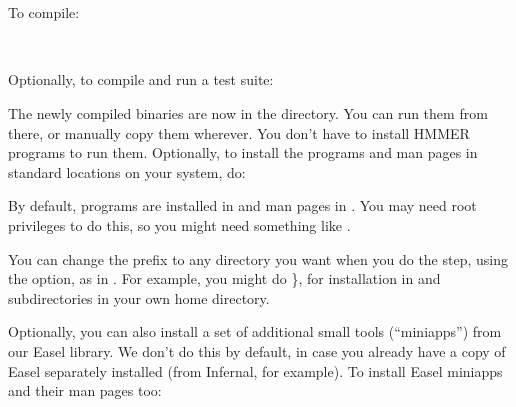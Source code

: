   \vspace{1ex}
  \\
  \\
  \vspace{1ex}

To compile:

  \vspace{1ex}
  \\ 
  \vspace{1ex}

Optionally, to compile and run a test suite:

  \vspace{1ex}
  \vspace{1ex}

The newly compiled binaries are now in the  directory.  You
can run them from there, or manually copy them wherever.  You don't
have to install HMMER programs to run them. Optionally, to install the
programs and man pages in standard locations on your system, do:

  \vspace{1ex}
  \vspace{1ex}

By default, programs are installed in  and man
pages in . You may need root
privileges to do this, so you might need something like .

You can change the  prefix to any directory you want
when you do the  step, using the  option, as in . For example, you might do
\}, for installation in
 and  subdirectories in your own home
directory.

Optionally, you can also install a set of additional small tools
(``miniapps'') from our Easel library.  We don't do this by default,
in case you already have a copy of Easel separately installed (from
Infernal, for example). To install Easel miniapps and their man pages
too:

  \vspace{1ex}
  \vspace{1ex}

